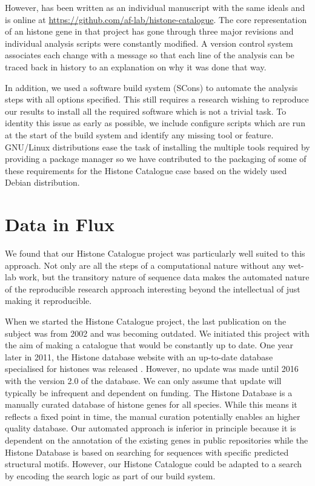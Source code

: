 However,
 has been written as an individual
manuscript with the same ideals and is online at
\url{https://github.com/af-lab/histone-catalogue}.  The core
representation of an histone gene in that project has gone through
three major revisions and individual analysis scripts were constantly
modified.  A version control system associates each change with a
message so that each line of the analysis can be traced back in
history to an explanation on why it was done that way.

In addition, we used a software build system (SCons) to automate the analysis
steps with all options specified.  This still requires a research
wishing to reproduce
our results to install all the required software which is not a
trivial task.  To identity this issue as early as possible, we include
configure scripts which are run at the start of the build system and
identify any missing tool or feature.  GNU/Linux distributions ease
the task of installing the multiple tools required by providing a
package manager so we have contributed to the packaging of
some of these requirements for the Histone Catalogue case based on the
widely used Debian distribution.


\section{Data in Flux}

We found that our Histone Catalogue project was particularly well suited
to this approach.  Not only are all the steps of a computational
nature without any wet-lab work, but the transitory nature of sequence data
makes the automated nature of the reproducible research approach interesting
beyond the intellectual of just making it reproducible.

When we started the Histone Catalogue project, the last publication on
the subject was from 2002 and was becoming outdated.  We initiated
this project with the aim of making a catalogue that would be
constantly up to date.  One year later in 2011, the Histone database
website with an up-to-date database specialised for histones
was released \addref{}.
However, no update was made until 2016 with the version 2.0 of
the database\addref{}.  We can only assume that update will typically
be infrequent and dependent on funding.
The Histone Database is a manually curated database of histone
genes for all species.  While this means it reflects a fixed point in time,
the manual curation potentially enables an higher quality database.
Our automated
approach is inferior in principle because it is dependent on the
annotation of the existing genes in public repositories
while the Histone Database is based on searching for
sequences with specific predicted structural motifs.  However, our
Histone Catalogue could be adapted to a search by
encoding the search logic as part of our build system.

